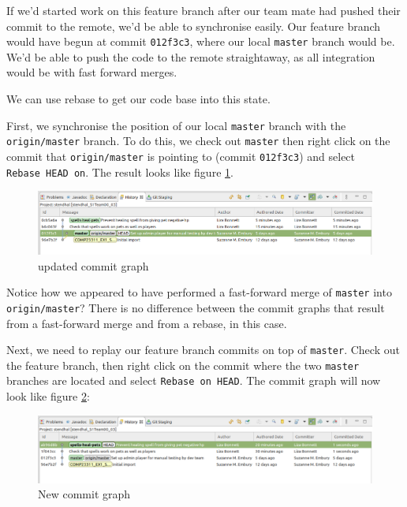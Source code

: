 \documentclass[
]{book}
\begin{document}
If we'd started work on this feature branch after our team mate had pushed their commit to the remote, we'd be able to synchronise easily. Our feature branch would have begun at commit \texttt{012f3c3}, where our local \texttt{master} branch would be. We'd be able to push the code to the remote straightaway, as all integration would be with fast forward merges.

We can use rebase to get our code base into this state.

First, we synchronise the position of our local \texttt{master} branch with the \texttt{origin/master} branch. To do this, we check out \texttt{master} then right click on the commit that \texttt{origin/master} is pointing to (commit \texttt{012f3c3}) and select \texttt{Rebase\ HEAD\ on}. The result looks like figure \ref{fig:localCommitGraphFBRebaseExampleAfterMasterRebaseNoHistory-fig}.

\begin{figure}

{\centering \includegraphics[width=1\linewidth]{images/localCommitGraphFBRebaseExampleAfterMasterRebaseNoHistory} 

}

\caption{updated commit graph}\label{fig:localCommitGraphFBRebaseExampleAfterMasterRebaseNoHistory-fig}
\end{figure}

Notice how we appeared to have performed a fast-forward merge of \texttt{master} into \texttt{origin/master}? There is no difference between the commit graphs that result from a fast-forward merge and from a rebase, in this case.

Next, we need to replay our feature branch commits on top of \texttt{master}. Check out the feature branch, then right click on the commit where the two \texttt{master} branches are located and select \texttt{Rebase\ on\ HEAD}. The commit graph will now look like figure \ref{fig:localCommitGraphFBRebaseExampleAfterFBRebaseNoHistory-fig}:

\begin{figure}

{\centering \includegraphics[width=1\linewidth]{images/localCommitGraphFBRebaseExampleAfterFBRebaseNoHistory} 

}

\caption{New commit graph}\label{fig:localCommitGraphFBRebaseExampleAfterFBRebaseNoHistory-fig}
\end{figure}
\end{document}
